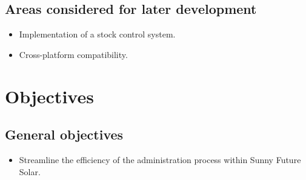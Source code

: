 		\subsection{Areas considered for later development}
		\begin{itemize}
			\item{Implementation of a stock control system.}
			\item{Cross-platform compatibility.}
		\end{itemize}
	\section{Objectives}
		\subsection{General objectives}
		\begin{itemize}
			\item{Streamline the efficiency of the administration process within Sunny Future Solar.}
		\end{itemize}
